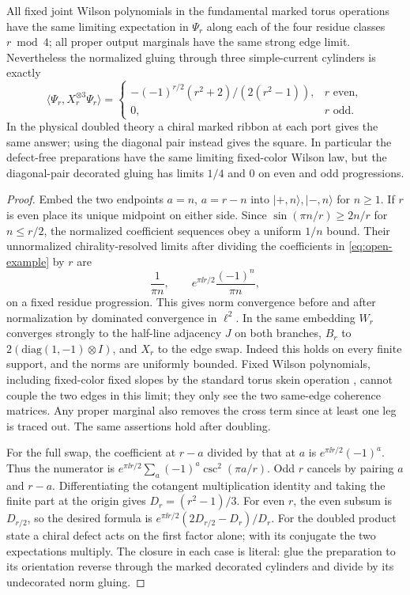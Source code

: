 \begin{theorem}\label{thm:phase}
All fixed joint Wilson polynomials in the fundamental marked torus operations have the same limiting expectation in \(\Psi_r\) along each of the four residue classes \(r\bmod4\); all proper output marginals have the same strong edge limit. Nevertheless the normalized gluing through three simple-current cylinders is exactly
\[
 \langle\Psi_r,X_r^{\otimes3}\Psi_r\rangle
 =\begin{cases}
 -(-1)^{r/2}(r^2+2)/(2(r^2-1)),&r\text{ even},\\
 0,&r\text{ odd}.
 \end{cases}
\]
In the physical doubled theory a chiral marked ribbon at each port gives the same answer; using the diagonal pair instead gives the square. In particular the defect-free preparations have the same limiting fixed-color Wilson law, but the diagonal-pair decorated gluing has limits \(1/4\) and \(0\) on even and odd progressions.
\end{theorem}

\begin{proof}
Embed the two endpoints \(a=n\), \(a=r-n\) into \(|+,n\rangle,|-,n\rangle\) for \(n\ge1\). If \(r\) is even place its unique midpoint on either side. Since \(\sin(\pi n/r)\ge 2n/r\) for \(n\le r/2\), the normalized coefficient sequences obey a uniform \(1/n\) bound. Their unnormalized chirality-resolved limits after dividing the coefficients in \eqref{eq:open-example} by \(r\) are
\[
 \frac{1}{\pi n},\qquad
 e^{\pi\ii r/2}\frac{(-1)^n}{\pi n},
\]
on a fixed residue progression. This gives norm convergence before and after normalization by dominated convergence in \(\ell^2\). In the same embedding \(W_r\) converges strongly to the half-line adjacency \(J\) on both branches, \(B_r\) to \(2(\mathrm{diag}(1,-1)\otimes I)\), and \(X_r\) to the edge swap. Indeed this holds on every finite support, and the norms are uniformly bounded. Fixed Wilson polynomials, including fixed-color fixed slopes by the standard torus skein operation \cite{FrohmanGelca}, cannot couple the two edges in this limit; they only see the two same-edge coherence matrices. Any proper marginal also removes the cross term since at least one leg is traced out. The same assertions hold after doubling.

For the full swap, the coefficient at \(r-a\) divided by that at \(a\) is \(e^{\pi\ii r/2}(-1)^a\). Thus the numerator is \(e^{\pi\ii r/2}\sum_a(-1)^a\csc^2(\pi a/r)\). Odd \(r\) cancels by pairing \(a\) and \(r-a\). Differentiating the cotangent multiplication identity and taking the finite part at the origin gives \(D_r=(r^2-1)/3\). For even \(r\), the even subsum is \(D_{r/2}\), so the desired formula is \(e^{\pi\ii r/2}(2D_{r/2}-D_r)/D_r\). For the doubled product state a chiral defect acts on the first factor alone; with its conjugate the two expectations multiply. The closure in each case is literal: glue the preparation to its orientation reverse through the marked decorated cylinders and divide by its undecorated norm gluing.
\end{proof}

